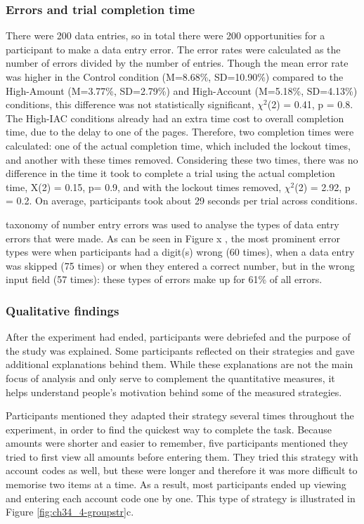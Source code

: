 \subsubsection{Errors and trial completion time}
There were 200 data entries, so in total there were 200 opportunities for a participant to make a data entry error. The error rates were calculated as the number of errors divided by the number of entries. Though the mean error rate was higher in the Control condition (M=8.68\%, SD=10.90\%) compared to the High-Amount (M=3.77\%, SD=2.79\%) and High-Account (M=5.18\%, SD=4.13\%) conditions, this difference was not statistically significant, $\chi^2$(2) = 0.41, p = 0.8. 
The High-IAC conditions already had an extra time cost to overall completion time, due to the delay to one of the pages. Therefore, two completion times were calculated: one of the actual completion time, which included the lockout times, and another with these times removed. Considering these two times, there was no difference in the time it took to complete a trial using the actual completion time, X(2) = 0.15, p= 0.9, and with the lockout times removed,  $\chi^2$(2) = 2.92, p = 0.2. On average, participants took about 29 seconds per trial across conditions.

\citet{Wiseman2011} taxonomy of number entry errors was used to analyse the types of data entry errors that were made. As can be seen in Figure x , the most prominent error types were when participants had a digit(s) wrong (60 times), when a data entry was skipped (75 times) or when they entered a correct number, but in the wrong input field (57 times): these types of errors make up for 61\% of all errors.


\subsubsection{Qualitative findings}
After the experiment had ended, participants were debriefed and the purpose of the study was explained. Some participants reflected on their strategies and gave additional explanations behind them. While these explanations are not the main focus of analysis and only serve to complement the quantitative measures, it helps understand people's motivation behind some of the measured strategies.

Participants mentioned they adapted their strategy several times throughout the experiment, in order to find the quickest way to complete the task. Because amounts were shorter and easier to remember, five participants mentioned they tried to first view all amounts before entering them. They tried this strategy with account codes as well, but these were longer and therefore it was more difficult to memorise two items at a time. As a result, most participants ended up viewing and entering each account code one by one. This type of strategy is illustrated in Figure \ref{fig:ch34_4-groupstr}c.

